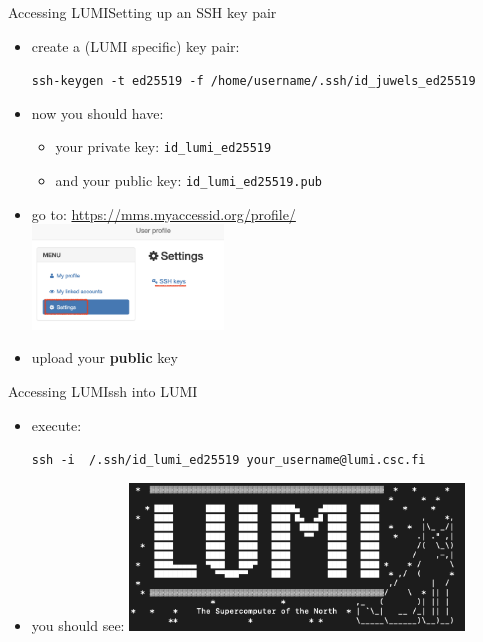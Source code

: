\documentclass[
  aspectratio=169,
  10pt
]{beamer}
\newcommand{\terminal}[1]{\par\noindent\colorbox{shadecolor}
{\parbox{\dimexpr\textwidth-2\fboxsep\relax}{\texttt{#1}}}}
\begin{document}
\begin{frame}[t,fragile]{Accessing LUMI}{Setting up an SSH key pair}

\begin{itemize}
    \item create a (LUMI specific) key pair:\\
    \terminal{ssh-keygen -t ed25519 -f /home/username/.ssh/id\_juwels\_ed25519}
    \item now you should have:
        \begin{itemize}
            \item your private key: \texttt{id\_lumi\_ed25519}
            \item and your public key: \texttt{id\_lumi\_ed25519.pub}
        \end{itemize}
    \item go to: \url{https://mms.myaccessid.org/profile/}\\
    \includegraphics[width=0.4\textwidth]{images/LUMI_key_registration.png}
    \item upload your \textbf{public} key
\end{itemize}

\end{frame}


\begin{frame}[t,fragile]{Accessing LUMI}{ssh into LUMI}

\begin{itemize}
    \item execute: \terminal{ssh -i ~/.ssh/id\_lumi\_ed25519 your\_username@lumi.csc.fi}
    \item you should see:\newline
    \includegraphics[width=0.7\textwidth]{images/LUMI_terminal.png}
\end{itemize}

\end{frame}
\end{document}
